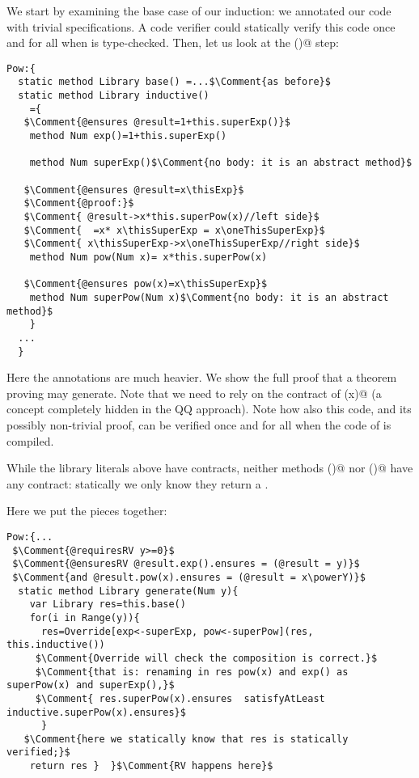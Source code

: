 We start by examining the base case of our induction: we annotated our 
code with trivial specifications.
A code verifier could statically verify this code 
once and for all when \Q@Pow@ is type-checked.
Then, let us look at the \Q@inductive()@ step:

\begin{lstlisting}
Pow:{
  static method Library base() =...$\Comment{as before}$
  static method Library inductive() 
    ={
   $\Comment{@ensures @result=1+this.superExp()}$
    method Num exp()=1+this.superExp() 
      
    method Num superExp()$\Comment{no body: it is an abstract method}$
      
   $\Comment{@ensures @result=x\thisExp}$
   $\Comment{@proof:}$
   $\Comment{ @result->x*this.superPow(x)//left side}$
   $\Comment{  =x* x\thisSuperExp = x\oneThisSuperExp}$
   $\Comment{ x\thisSuperExp->x\oneThisSuperExp//right side}$
    method Num pow(Num x)= x*this.superPow(x)
      
   $\Comment{@ensures pow(x)=x\thisSuperExp}$
    method Num superPow(Num x)$\Comment{no body: it is an abstract method}$
    }
  ...
  }
\end{lstlisting}

Here the annotations are much heavier.
We show the full proof that a theorem proving may generate.
Note that we need to rely on the contract of \Q@superPow(x)@ (a concept completely hidden in the QQ approach).
Note how also this code, and its possibly non-trivial proof, can be verified once and for all when the code of \Q@Pow@ is compiled.

While the library literals above have contracts,
neither methods \Q@base()@ nor \Q@inductive()@ have any contract:
statically we only know they return a \Q@Library@.

Here we put the pieces together:

\begin{lstlisting}
Pow:{...
 $\Comment{@requiresRV y>=0}$
 $\Comment{@ensuresRV @result.exp().ensures = (@result = y)}$
 $\Comment{and @result.pow(x).ensures = (@result = x\powerY)}$
  static method Library generate(Num y){
    var Library res=this.base()
    for(i in Range(y)){
      res=Override[exp<-superExp, pow<-superPow](res, this.inductive())
     $\Comment{Override will check the composition is correct.}$
     $\Comment{that is: renaming in res pow(x) and exp() as superPow(x) and superExp(),}$
     $\Comment{ res.superPow(x).ensures  satisfyAtLeast inductive.superPow(x).ensures}$
      }
   $\Comment{here we statically know that res is statically verified;}$
    return res }  }$\Comment{RV happens here}$
\end{lstlisting}

